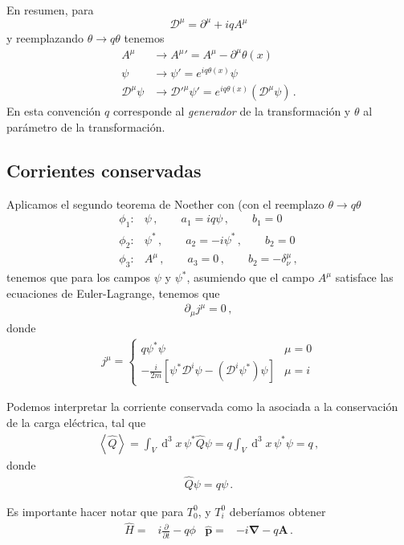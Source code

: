 \begin{frame}
  En resumen, para 
\begin{equation}
  \mathcal{D}^\mu=\partial^\mu+iqA^\mu
\end{equation}
y reemplazando $\theta\to q\theta$ tenemos
\begin{align}
\label{eq:tfgl}
   A^\mu&\to{A^\mu}'=A^\mu-\partial^\mu\theta(x)\\
   \psi&\to \psi'=e^{iq\theta(x)}\psi\nonumber\\
  \mathcal{D}^\mu\psi&\to {\mathcal{D}'}^\mu\psi'=e^{iq\theta(x)}(\mathcal{D}^\mu\psi)\,.
\end{align}
En esta convención $q$ corresponde al \emph{generador} de la transformación y $\theta$ al parámetro de la transformación.
\end{frame}


\subsection{Corrientes conservadas}
\begin{frame}
Aplicamos el segundo teorema de Noether con (con el reemplazo $\theta\to q\theta$
\begin{align}
  \phi_{1}:& \psi\,,\qquad a_{1}=iq \psi \,,\qquad b_1=0\nonumber\\
  \phi_{2}:& \psi^{*}\,,\qquad a_{2}=-i\psi^{*}\,,\qquad b_2=0 \nonumber\\
  \phi_{3}:& A^{\mu}\,,\qquad a_{3}=0\,,\qquad b_2=-\delta^{\mu}_{\nu}\,,
\end{align}
tenemos que para los campos $\psi$ y $\psi^{*}$, asumiendo que el campo $A^{\mu}$ satisface las ecuaciones de Euler-Lagrange, tenemos que
\begin{align}
  \partial_{\mu}j^{\mu}=0\,,
\end{align}
donde
\begin{align}
  j^{\mu}=
  \begin{cases}
q \psi^{*}\psi & \mu=0\\
-\frac{i}{2m} \left[ \psi^{*}\mathcal{D}^i\psi-\left( \mathcal{D}^i\psi^{*} \right)\psi \right] & \mu=i
  \end{cases}
\end{align}

Podemos interpretar la corriente conservada como la asociada a la conservación de la carga eléctrica, tal que
\begin{align}
  \left\langle \widehat{Q} \right\rangle =\int_{V}\operatorname{d}^3x\, \psi^{*} \widehat{Q} \psi=q\int_{V}\operatorname{d}^3x\, \psi^{*} \psi=q\,,
\end{align}
donde
\begin{align}
  \widehat{Q} \psi=q\psi\,.
\end{align}


Es importante hacer notar que para  $T^0_0$, y $T^0_i$ deberíamos obtener
\begin{align}
  \widehat{H}=& i\frac{\partial}{\partial t}-q\phi & \widehat{\mathbf{p}}=&-i\boldsymbol{\nabla}-q\mathbf{A}\,.
\end{align}

\end{frame}

